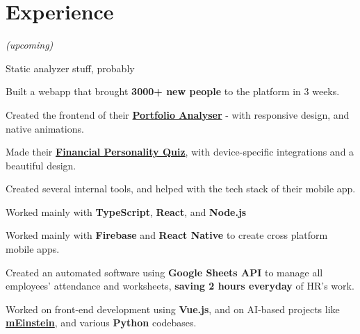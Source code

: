 \documentclass[]{resume}
\begin{document}
\begin{minipage}[t]{0.62\textwidth} 


\section{Experience}
\emph{(upcoming)}
\vspace{\topsep} %
\begin{tightemize}
\item Static analyzer stuff, probably
\end{tightemize}
\sectionsep

\begin{tightemize}
\item Built a webapp that brought \textbf{3000+ new people} to the platform in 3 weeks.
\item Created the frontend of their  \href{https://jupiter.money/portfolio-analyser}{\textbf{Portfolio Analyser}} - with responsive design, and native animations.
\item Made their \href{https://jupiter.money/quiz}{\textbf{Financial Personality Quiz}}, with device-specific integrations and a beautiful design.
\item Created several internal tools, and helped with the tech stack of their mobile app.
\item Worked mainly with \textbf{TypeScript}, \textbf{React}, and \textbf{Node.js}
\end{tightemize}
\sectionsep

\begin{tightemize}
\item Worked mainly with \textbf{Firebase} and \textbf{React Native} to create cross platform mobile apps.
\end{tightemize}
\sectionsep


\begin{tightemize}
\item Created an automated software using \textbf{Google Sheets API} to manage all employees’ attendance and worksheets, \textbf{saving 2 hours everyday} of HR's work.
\item Worked on front-end development using \textbf{Vue.js}, and on AI-based projects like \href{https://meinstein.ai/}{\textbf{mEinstein}}, and various \textbf{Python} codebases.
\end{tightemize}
\sectionsep



\end{minipage}
\end{document}
